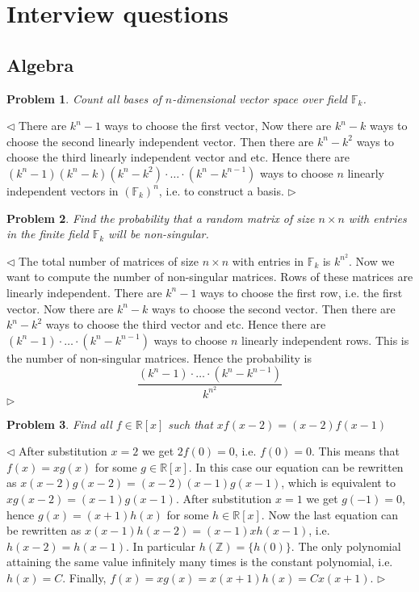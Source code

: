 \documentclass[12pt]{article}
\newtheorem{problem}{Problem}[subsection]
\newenvironment{solution}{\par $\triangleleft$}{$\triangleright$}
\begin{document}
 
 
\section{Interview questions}
 
\subsection{Algebra}
 
\begin{problem} Count all bases of $n$-dimensional vector space over field $\mathbb{F}_k$.
\end{problem}
\begin{solution} There are $k^n-1$ ways to choose the first vector, Now there are $k^n-k$ ways to choose the second linearly independent vector. Then there are $k^n-k^2$ ways to choose the third linearly independent vector and etc. Hence there are $(k^n-1)(k^n-k)(k^n-k^2)\cdot\ldots\cdot(k^n-k^{n-1})$ ways to choose $n$ linearly independent vectors in $(\mathbb{F}_k)^n$, i.e. to construct a basis.
\end{solution}
 
\begin{problem} Find the probability that a random matrix of size $n\times n$ with entries in the finite field $\mathbb{F}_k$ will be non-singular.
\end{problem}
\begin{solution} The total number of matrices of size $n\times n$ with entries in $\mathbb{F}_k$ is $k^{n^2}$. Now we want to compute the number of non-singular matrices. Rows of these matrices are linearly independent. There are $k^n-1$ ways to choose the first row, i.e. the first vector. Now there are $k^n-k$ ways to choose the second vector. Then there are $k^n-k^2$ ways to choose the third vector and  etc. Hence there are $(k^n-1)\cdot\ldots\cdot(k^n-k^{n-1})$ ways to choose $n$ linearly independent rows. This is the number of non-singular matrices. Hence the probability is
$$
\frac{(k^n-1)\cdot\ldots\cdot(k^n-k^{n-1})}{k^{n^2}}
$$
\end{solution}
 
\begin{problem} Find all $f\in \mathbb{R}[x]$ such that $xf(x-2)=(x-2)f(x-1)$
\end{problem}
\begin{solution} After substitution $x=2$ we get $2f(0)=0$, i.e. $f(0)=0$. This means that $f(x)=xg(x)$ for some $g\in\mathbb{R}[x]$. In this case our equation can be rewritten as $x(x-2)g(x-2)=(x-2)(x-1)g(x-1)$, which is equivalent to $xg(x-2)=(x-1)g(x-1)$. After substitution $x=1$ we get $g(-1)=0$, hence $g(x)=(x+1)h(x)$ for some $h\in\mathbb{R}[x]$. Now the last equation can be rewritten as $x(x-1)h(x-2)=(x-1)xh(x-1)$, i.e. $h(x-2)=h(x-1)$. In particular $h(\mathbb{Z})=\{h(0)\}$. The only polynomial attaining the same value infinitely many times is the constant polynomial, i.e. $h(x)=C$. Finally, $f(x)=xg(x)=x(x+1)h(x)=Cx(x+1)$.
\end{solution}
 
\end{document}

